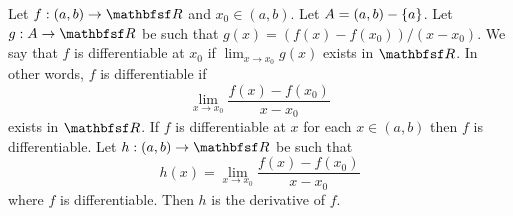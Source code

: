 
Let $f: (a,b) \to \R$ and $x_0 \in (a, b)$.
Let $A = (a, b) - \{a\}$.
Let $g: A \to \R$ be such that
$g(x) = (f(x) - f(x_0))/(x - x_0)$.
We say that $f$ is differentiable at $x_0$ if
$\lim_{x \to x_0} g(x)$ exists in $\R$.
In other words, $f$ is differentiable if
\[
  \lim_{x \to x_0}
  \frac{f(x) - f(x_0)}{x - x_0}
\]
exists in $\R$.
If $f$ is differentiable at $x$ for each
$x \in (a, b)$ then $f$ is differentiable.
Let $h: (a,b) \to \R$ be such that
\[
  h(x) = \lim_{x \to x_0} \frac{f(x) - f(x_0)}{x - x_0}
\]
where $f$ is differentiable.  Then $h$ is the derivative of $f$.
\strats
